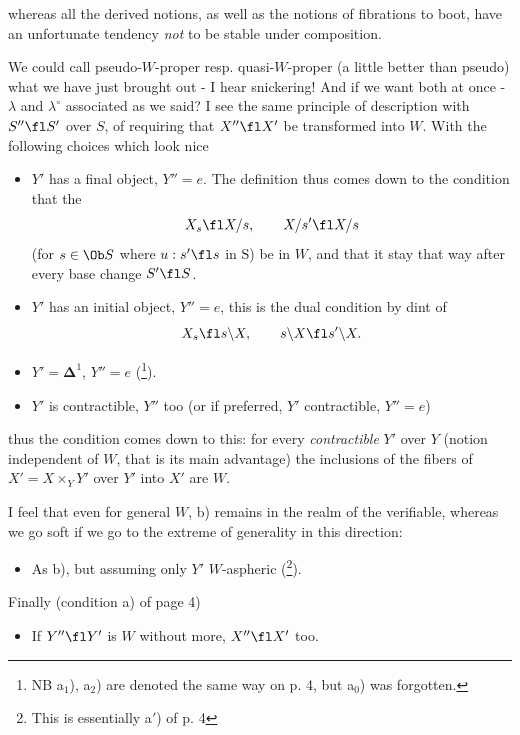 whereas all the derived notions, as well as the notions of fibrations to boot, have an unfortunate tendency \textit{not} to be stable under composition.

We could call pseudo-$W$-proper resp. quasi-$W$-proper (a little better than pseudo) what we have just brought out - I hear snickering! And if we want both at once - $\lambda$ and $\lambda^{\circ}$ associated as we said? I see the same principle of description with $S''\fl S'$ over $S$, of requiring that $X''\fl X'$ be transformed into $W$. With the following choices which look nice

\begin{itemize}
\item[a$_1$)] $Y'$ has a final object, $Y''=e$. The definition thus comes down to the condition that the
\[ X_s\fl X/s, \qquad X/s'\fl X/s \]
(for $s\in\Ob S$ where $u : s'\fl s$ in $\mathrm{S}$) be in $W$, and that it stay that way after every base change $S'\fl S$.

\item[a$_2$)] $Y'$ has an initial object, $Y''=e$, this is the dual condition by dint of
\[ X_s\fl s\backslash X, \qquad s\backslash X\fl s'\backslash X. \]

\item[a$_0$)] $Y'=\boldsymbol{\Delta}^1$, $Y''=e$ (\footnote[46]{NB a$_1$), a$_2$) are denoted the same way on p. 4, but a$_0$) was forgotten.}).

\item[b)] $Y'$ is contractible, $Y''$ too (or if preferred, $Y'$ contractible, $Y''=e$)
\end{itemize}

thus the condition comes down to this: for every \textit{contractible} $Y'$ over $Y$ (notion independent of $W$, that is its main advantage) the inclusions of the fibers of $X'=X\times_Y Y'$ over $Y'$ into $X'$ are $W$.

I feel that even for general $W$, b) remains in the realm of the verifiable, whereas we go soft if we go to the extreme of generality in this direction:

\begin{itemize}
\item[b$'$)] As b), but assuming only $Y'$ $W$-aspheric (\footnote[47]{This is essentially a$'$) of p. 4}).
\end{itemize}

Finally (condition a) of page 4)

\begin{itemize}
\item[c)] If $Y''\fl Y'$ is $W$ without more, $X''\fl X'$ too.
\end{itemize}

